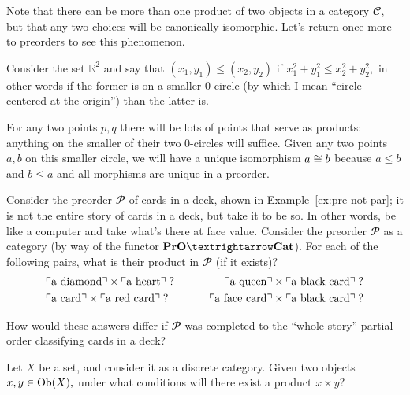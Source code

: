 \documentclass[../main/CT4S-EN-RU]{subfiles}
\begin{document}
\begin{exampleENG}
Note that there can be more than one product of two objects in a category ${𝓒},$ but that any two choices will be canonically isomorphic. Let's return once more to preorders to see this phenomenon.

Consider the set ${ℝ}^2$ and say that $(x_1,y_1)\leq (x_2,y_2)$ if $x_1^2+y_1^2\leq x_2^2+y_2^2,$ in other words if the former is on a smaller 0-circle (by which I mean “circle centered at the origin”) than the latter is. 

For any two points $p,q$ there will be lots of points that serve as products: anything on the smaller of their two 0-circles will suffice. Given any two points $a,b$ on this smaller circle, we will have a unique isomorphism $a\cong b$ because $a\leq b$ and $b\leq a$ and all morphisms are unique in a preorder.
\end{exampleENG}

\begin{exampleRUS}
\end{exampleRUS}

\begin{exerciseENG}
Consider the preorder ${𝓟}$ of cards in a deck, shown in Example~\ref{ex:pre not par}; it is not the entire story of cards in a deck, but take it to be so. In other words, be like a computer and take what's there at face value. Consider the preorder ${𝓟}$ as a category (by way of the functor $\PrO{→}\Cat$).
\sexc For each of the following pairs, what is their product in ${𝓟}$ (if it exists)?
\begin{align*}
&\textnormal{$\ulcorner$a diamond$\urcorner$}\times\textnormal{$\ulcorner$a heart$\urcorner$}\;? \hspace{.3in} &\textnormal{$\ulcorner$a queen$\urcorner$}\times\textnormal{$\ulcorner$a black card$\urcorner$}\;?\\
& \textnormal{$\ulcorner$a card$\urcorner$}\times\textnormal{$\ulcorner$a red card$\urcorner$}\;?\hspace{.3in}&\textnormal{$\ulcorner$a face card$\urcorner$}\times\textnormal{$\ulcorner$a black card$\urcorner$}\;?
\end{align*}
\item How would these answers differ if ${𝓟}$ was completed to the “whole story” partial order classifying cards in a deck?
\endsexc
\end{exerciseENG}

\begin{exerciseRUS}
\end{exerciseRUS}

\begin{exerciseENG}
Let $X$ be a set, and consider it as a discrete category. Given two objects $x,y\in\operatorname{Ob}(X),$ under what conditions will there exist a product $x\times y?$
\end{exerciseENG}
\end{document}
